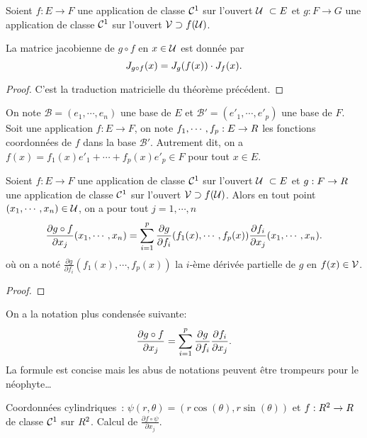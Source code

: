\sld{\vfill\pagebreak[5]}%
\begin{proposition}
	Soient $f:E \to F$ une application de classe $\mathcal{C}^1$ sur l'ouvert $\U \subset E$ et $g:F\to G$ une application de classe $\mathcal{C}^1$ sur l'ouvert $\mathcal{V}\supset f(\mathcal{U})$.
	
	La matrice jacobienne de $g\circ f$ en $x\in\mathcal{U}$ est donnée par 
	\[
		J_{g\circ f} (x) = J_{g}(f(x)) \cdot J_f(x).
	\]
\end{proposition}

\begin{proof}
	C'est la traduction matricielle du théorème précédent.
\end{proof}

\sld{\vfill\pagebreak[5]}%
On note $\mathcal B = (e_1,\cdots,e_n)$ une base de $E$ et $\mathcal B' = (e'_1,\cdots,e'_p)$ une base de $F$. Soit une application $f:E \to F$, on note $f_1,\cdots,f_p: E \to R$ les fonctions coordonnées de $f$ dans la base $\mathcal B'$. Autrement dit, on a $f(x) = f_1(x) e'_1 + \cdots + f_p(x) e'_p \in F$  pour tout $x\in E$.
\begin{proposition}
	Soient $f:E \to F$ une application de classe $\mathcal{C}^1$ sur l'ouvert $\U \subset E$ et $g:F\to R$ une application de classe $\mathcal{C}^1$ sur l'ouvert $\mathcal{V}\supset f(\mathcal{U})$.
	Alors en tout point $(x_1,\cdots,x_n) \in \mathcal{U}$, on a pour tout $j = 1,\cdots,n $
	\[
		\frac{\partial g\circ f}{\partial x_j}(x_1,\cdots,x_n) = \sum_{i=1}^p \frac{\partial g}{\partial f_i}(f_1(x) , \cdots, f_p(x) ) \frac{\partial f_i}{\partial x_j}(x_1,\cdots,x_n).
	\]
	où on a noté $ \frac{\partial g}{\partial f_i}(f_1(x) , \cdots, f_p(x) )$ la $i$-ème dérivée partielle de $g$ en $f(x) \in \mathcal{V}$.
\end{proposition}

\begin{proof}
	\pl{\rep{6cm}}
\end{proof}

\sld{\vfill\pagebreak[5]}%
\begin{remark}
	On a la notation plus condensée suivante: 
	\[
		\frac{\partial g\circ f}{\partial x_j} = \sum_{i=1}^p \frac{\partial g}{\partial f_i} \frac{\partial f_i}{\partial x_j}.
	\]
	La formule est concise mais les abus de notations peuvent être trompeurs pour le néophyte\ldots
\end{remark}


\begin{exemple}
	Coordonnées cylindriques~: $\psi(r,\theta) = (r\cos(\theta), r \sin(\theta))$ et $f:R^2 \to R$ de classe $\mathcal{C}^1$ sur $R^2$. Calcul de $\frac{\partial f \circ \psi}{\partial x_j}$.
	\pl{\rep{6cm}}
\end{exemple}

